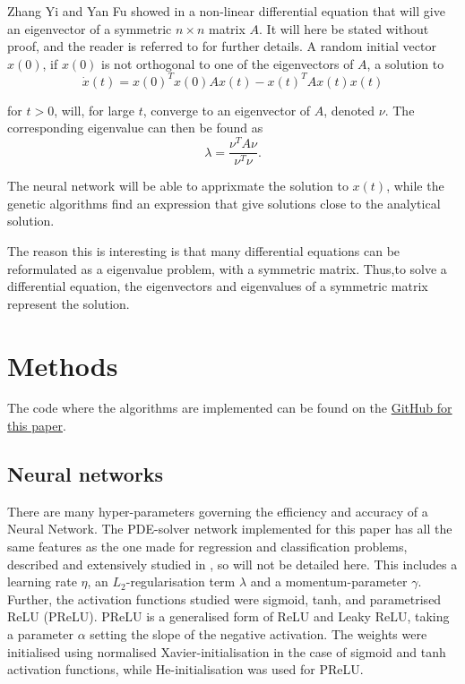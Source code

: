 \documentclass[multicolumn, 9pt]{extarticle}
\begin{document}
Zhang Yi and Yan Fu showed in \cite{symmetric} a non-linear differential equation that will give an eigenvector of a symmetric $n\times n$ matrix $A$. It will here be stated without proof, and the reader is referred to \cite{symmetric} for further details. A random initial vector $x(0)$, if $x(0)$ is not orthogonal to one of the eigenvectors of $A$, a solution to
\begin{equation}\label{eq:diff_sym}
	\dot{x}(t) = x(0)^Tx(0)Ax(t)-x(t)^TAx(t)x(t)
\end{equation}

for $t>0$, will, for large $t$, converge to an eigenvector of $A$, denoted $\nu$. The corresponding eigenvalue can then be found as
\begin{equation}
	\label{eq:eigval}
	\lambda = \frac{\nu^TA\nu}{\nu^T\nu}.
\end{equation}

The neural network will be able to apprixmate the solution to $x(t)$, while the genetic algorithms find an expression that give solutions close to the analytical solution.

The reason this is interesting is that many differential equations can be reformulated as a eigenvalue problem, with a symmetric matrix. Thus,to solve a differential equation, the eigenvectors and eigenvalues of a symmetric matrix represent the solution.


\section{Methods}
The code where the algorithms are implemented can be found on the \href{https://github.com/SaraPJensen/FYS-STK/tree/main/Project3/code}{GitHub for this paper}.

\subsection{Neural networks}
There are many hyper-parameters governing the efficiency and accuracy of a Neural Network. The PDE-solver network implemented for this paper has all the same features as the one made for regression and classification problems, described and extensively studied in \cite{p2HO}, so will not be detailed here. This includes a learning rate $\eta$, an $L_2$-regularisation term $\lambda$ and a momentum-parameter $\gamma$. Further, the activation functions studied were sigmoid, tanh, and parametrised ReLU (PReLU). PReLU is a generalised form of ReLU and Leaky ReLU, taking a parameter $\alpha$ setting the slope of the negative activation. The weights were initialised using normalised Xavier-initialisation in the case of sigmoid and tanh activation functions, while He-initialisation was used for PReLU.
\end{document}
